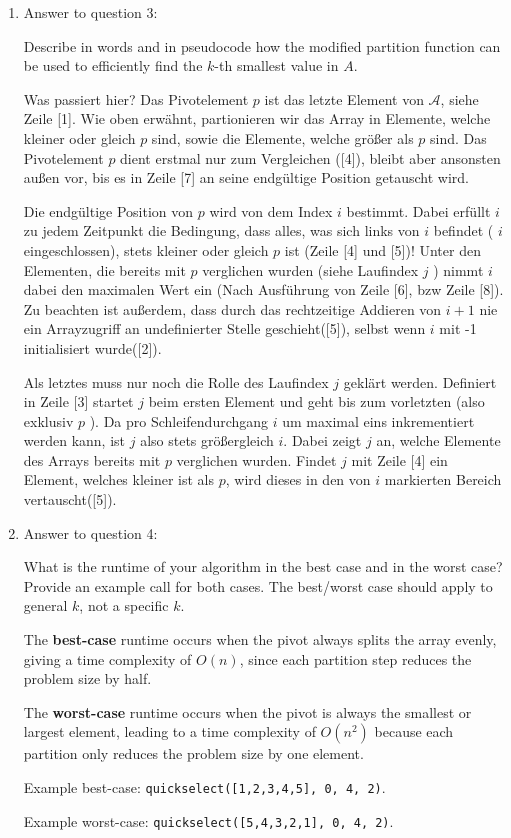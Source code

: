 \documentclass[11pt]{article}
\begin{document}
\begin{enumerate}
	      \pagebreak

	\item Answer to question 3:

	      Describe in words and in pseudocode how the modified partition function can be used to efficiently find the $k$-th smallest value in $A$.

	      Was passiert hier? Das Pivotelement $p$ ist das letzte Element von $\mathcal{A}$, siehe Zeile [1]. Wie oben erwähnt, partionieren wir das Array in Elemente, welche kleiner oder gleich $p$ sind, sowie die Elemente, welche größer als $p$ sind. Das Pivotelement $p$ dient erstmal nur zum Vergleichen ([4]), bleibt aber ansonsten außen vor, bis es in Zeile [7] an seine endgültige Position getauscht wird.

	      Die endgültige Position von $p$ wird von dem Index $i$ bestimmt. Dabei erfüllt $i$ zu jedem Zeitpunkt die Bedingung, dass alles, was sich links von $i$ befindet ( $i$ eingeschlossen), stets kleiner oder gleich $p$ ist (Zeile [4] und [5])! Unter den Elementen, die bereits mit $p$ verglichen wurden (siehe Laufindex $j$ ) nimmt $i$ dabei den maximalen Wert ein (Nach Ausführung von Zeile [6], bzw Zeile [8]). Zu beachten ist außerdem, dass durch das rechtzeitige Addieren von $i+1$ nie ein Arrayzugriff an undefinierter Stelle geschieht([5]), selbst wenn $i$ mit -1 initialisiert wurde([2]).

	      Als letztes muss nur noch die Rolle des Laufindex $j$ geklärt werden. Definiert in Zeile [3] startet $j$ beim ersten Element und geht bis zum vorletzten (also exklusiv $p$ ). Da pro Schleifendurchgang $i$ um maximal eins inkrementiert werden kann, ist $j$ also stets größergleich $i$. Dabei zeigt $j$ an, welche Elemente des Arrays bereits mit $p$ verglichen wurden. Findet $j$ mit Zeile [4] ein Element, welches kleiner ist als $p$, wird dieses in den von $i$ markierten Bereich vertauscht([5]).



	\item Answer to question 4:

	      What is the runtime of your algorithm in the best case and in the worst case? Provide an example call for both cases. The best/worst case should apply to general $k$, not a specific $k$.

	      The \textbf{best-case} runtime occurs when the pivot always splits the array evenly, giving a time complexity of $O(n)$, since each partition step reduces the problem size by half.

	      The \textbf{worst-case} runtime occurs when the pivot is always the smallest or largest element, leading to a time complexity of $O(n^2)$ because each partition only reduces the problem size by one element.

	      Example best-case: \texttt{quickselect([1,2,3,4,5], 0, 4, 2)}.

	      Example worst-case: \texttt{quickselect([5,4,3,2,1], 0, 4, 2)}.

\end{enumerate}
\end{document}
